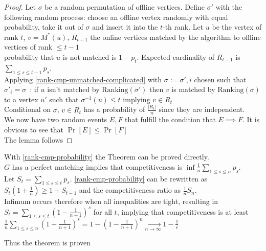 \begin{proof}
	Let $\sigma$ be a random permutation of offline vertices. Define $\sigma'$ with the following random process: choose an offline vertex randomly with equal probability, take it out of $\sigma$ and insert it into the $t$-th rank. Let $u$ be the vertex of rank $t$, $v=M^*(u)$, $R_{t-1}$ the online vertices matched by the algorithm to offline vertices of rank $\leq t-1$\\
	probability that $u$ is not matched is $1-p_t$. Expected cardinality of $R_{t-1}$ is $\sum\limits_{1\leq s\leq t-1}p_s$.\\
	Applying \autoref{rank-cmp-unmatched-complicated} with $\sigma:=\sigma',i$ chosen such that $\sigma'_i=\sigma$\ : if $u$ isn't matched by $\mathrm{Ranking}(\sigma')$ then $v$ is matched by $\mathrm{Ranking}(\sigma)$ to a vertex $u'$ such that $\sigma^{-1}(u)\leq t$ implying $v\in R_t$\\
	Conditional on $\sigma$, $v\in R_t$ has a probability of $\frac{|R_t|}{n}$ since they are independent.\\
	We now have two random events $E,F$ that fulfill the condition that $E\implies F$. It is obvious to see that $\Pr[E]\leq\Pr[F]$\\
	The lemma follows
\end{proof}

With \autoref{rank-cmp-probability} the Theorem can be proved directly.\\
$G$ has a perfect matching implies that competitiveness is $\inf \frac{1}{n} \sum\limits_{1\leq s\leq n}p_s$.\\
Let $S_t=\sum\limits_{1\leq s\leq t}p_s$. \autoref{rank-cmp-probability} can be rewritten as $S_t(1+\frac{1}{n})\geq 1 + S_{t-1}$ and the competitiveness ratio as $\frac{1}{n}S_n$.\\
Infimum occurs therefore when all inequalities are tight, resulting in $S_t=\sum\limits_{1\leq s\leq t}(1-\frac{1}{n+1})^s$ for all $t$, implying that competitiveness is at least $\frac{1}{n}\sum\limits_{1\leq s\leq n}(1-\frac{1}{n+1})^s=1-(1-\frac{1}{n+1})^n\xrightarrow[n\to\infty]{}1-\frac{1}{e}$

Thus the theorem is proven